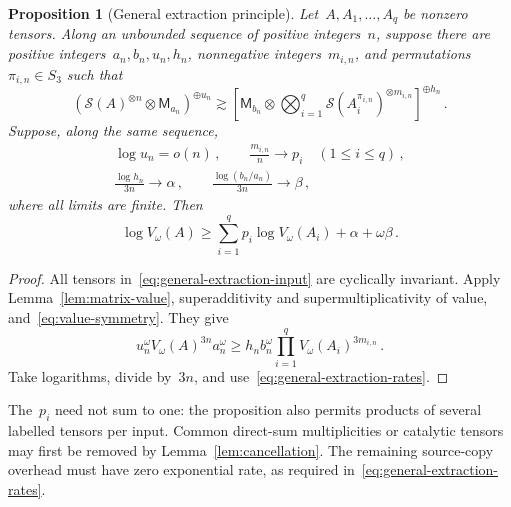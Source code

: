 \documentclass[11pt,letterpaper]{article}
\newtheorem{proposition}[theorem]{Proposition}
\theoremstyle{definition}
\numberwithin{equation}{section}
\newcommand{\MM}{\mathsf M}
\begin{document}
\begin{samepage}
\begin{proposition}[General extraction principle]\label{prop:general-extraction}
Let~$A,A_1,\ldots,A_q$ be nonzero tensors. Along an unbounded sequence of positive integers~$n$, suppose there are positive integers~$a_n,b_n,u_n,h_n$, nonnegative integers~$m_{i,n}$, and permutations~$\pi_{i,n}\in S_3$ such that
\begin{equation}\label{eq:general-extraction-input}
 \left(\mathcal S(A)^{\otimes n}\otimes\MM_{a_n}\right)^{\oplus u_n}
 \gtrsim\left[\MM_{b_n}\otimes
 \bigotimes_{i=1}^q\mathcal S(A_i^{\pi_{i,n}})^{\otimes m_{i,n}}\right]^{\oplus h_n}\,.
\end{equation}
Suppose, along the same sequence,
\begin{equation}\label{eq:general-extraction-rates}
 \begin{gathered}
 \log u_n=o(n)\,,\qquad \frac{m_{i,n}}n\longrightarrow p_i\quad(1\leq i\leq q)\,,\\
 \frac{\log h_n}{3n}\longrightarrow\alpha\,,\qquad
 \frac{\log(b_n/a_n)}{3n}\longrightarrow\beta\,,
 \end{gathered}
\end{equation}
where all limits are finite. Then
\begin{equation}\label{eq:general-extraction-value}
 \log V_\omega(A)\geq
 \sum_{i=1}^q p_i\log V_\omega(A_i)+\alpha+\omega\beta\,.
\end{equation}
\end{proposition}
\end{samepage}
\begin{proof}
All tensors in~\eqref{eq:general-extraction-input} are cyclically invariant. Apply Lemma~\ref{lem:matrix-value}, superadditivity and supermultiplicativity of value, and~\eqref{eq:value-symmetry}. They give
\begin{equation*}
 u_n^\omega V_\omega(A)^{3n}a_n^\omega
 \geq h_n b_n^\omega
 \prod_{i=1}^q V_\omega(A_i)^{3m_{i,n}}\,.
\end{equation*}
Take logarithms, divide by~$3n$, and use~\eqref{eq:general-extraction-rates}.
\end{proof}

The~$p_i$ need not sum to one: the proposition also permits products of several labelled tensors per input. Common direct-sum multiplicities or catalytic tensors may first be removed by Lemma~\ref{lem:cancellation}. The remaining source-copy overhead must have zero exponential rate, as required in~\eqref{eq:general-extraction-rates}.
\end{document}
